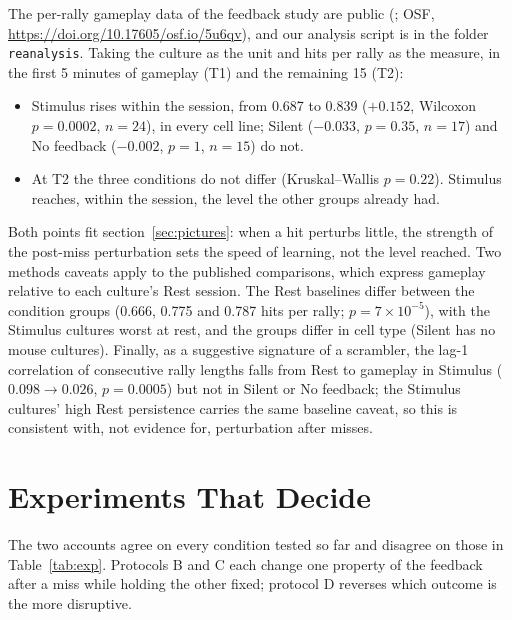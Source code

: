 \documentclass[12pt]{article}
\numberwithin{equation}{section}
\begin{document}
The per-rally gameplay data of the feedback study are public (\citealp{Kagan2022}; OSF, \url{https://doi.org/10.17605/osf.io/5u6qv}), and our analysis script is in the folder \texttt{reanalysis}. Taking the culture as the unit and hits per rally as the measure, in the first 5 minutes of gameplay (T1) and the remaining 15 (T2):
\begin{itemize}
\item Stimulus rises within the session, from 0.687 to 0.839 ($+0.152$, Wilcoxon $p=0.0002$, $n=24$), in every cell line; Silent ($-0.033$, $p=0.35$, $n=17$) and No feedback ($-0.002$, $p=1$, $n=15$) do not.
\item At T2 the three conditions do not differ (Kruskal--Wallis $p=0.22$). Stimulus reaches, within the session, the level the other groups already had.
\end{itemize}
Both points fit section~\ref{sec:pictures}: when a hit perturbs little, the strength of the post-miss perturbation sets the speed of learning, not the level reached. Two methods caveats apply to the published comparisons, which express gameplay relative to each culture's Rest session. The Rest baselines differ between the condition groups (0.666, 0.775 and 0.787 hits per rally; $p=7\times10^{-5}$), with the Stimulus cultures worst at rest, and the groups differ in cell type (Silent has no mouse cultures). Finally, as a suggestive signature of a scrambler, the lag-1 correlation of consecutive rally lengths falls from Rest to gameplay in Stimulus ($0.098\to0.026$, $p=0.0005$) but not in Silent or No feedback; the Stimulus cultures' high Rest persistence carries the same baseline caveat, so this is consistent with, not evidence for, perturbation after misses.

\section{Experiments That Decide}\label{sec:exp}

The two accounts agree on every condition tested so far and disagree on those in Table~\ref{tab:exp}. Protocols B and C each change one property of the feedback after a miss while holding the other fixed; protocol D reverses which outcome is the more disruptive.
\end{document}
